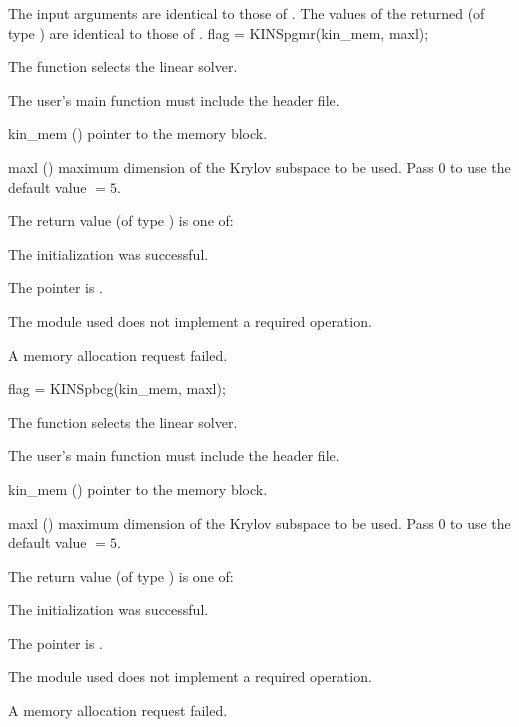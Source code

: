{
  The input arguments are identical to those of .
}
{
  The values of the returned  (of type ) are identical
  to those of .
}
{}
{
  flag = KINSpgmr(kin\_mem, maxl);
}
{
  The function  selects the {\kinspgmr} linear solver.

  The user's main function must include the  header file.
}
{
  \begin{args}
  \item[kin\_mem] ()
    pointer to the {\kinsol} memory block.
  \item[maxl] ()
    maximum dimension of the Krylov subspace to be used. Pass $0$ to use the 
    default value $=5$.
  \end{args}
}
{
  The return value  (of type ) is one of:
  \begin{args}
  \item[\Id{KINSPILS\_SUCCESS}] 
    The {\kinspgmr} initialization was successful.
  \item[\Id{KINSPILS\_MEM\_NULL}]
    The  pointer is .
  \item[\Id{KINSPILS\_ILL\_INPUT}]
    The {\nvector} module used does not implement a required operation.
  \item[\Id{KINSPILS\_MEM\_FAIL}]
    A memory allocation request failed.
  \end{args}
}
{}
{
  flag = KINSpbcg(kin\_mem, maxl);
}
{
  The function  selects the {\kinspbcg} linear solver.

  The user's main function must include the  header file.
}
{
  \begin{args}
  \item[kin\_mem] ()
    pointer to the {\kinsol} memory block.
  \item[maxl] ()
    maximum dimension of the Krylov subspace to be used. Pass $0$ to use the 
    default value $=5$.
  \end{args}
}
{
  The return value  (of type ) is one of:
  \begin{args}
  \item[\Id{KINSPILS\_SUCCESS}] 
    The {\kinspbcg} initialization was successful.
  \item[\Id{KINSPILS\_MEM\_NULL}]
    The  pointer is .
  \item[\Id{KINSPILS\_ILL\_INPUT}]
    The {\nvector} module used does not implement a required operation.
  \item[\Id{KINSPILS\_MEM\_FAIL}]
    A memory allocation request failed.
  \end{args}
}
